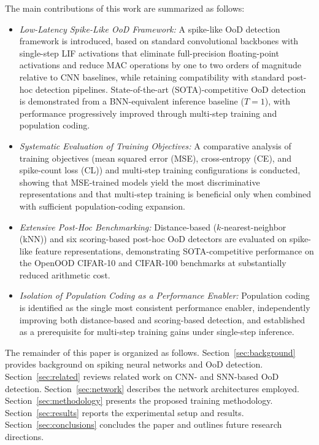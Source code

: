 \documentclass{ieeeaccess}
\begin{document}
The main contributions of this work are summarized as follows:
\begin{itemize}
  \item \textit{Low-Latency Spike-Like OoD Framework:} A spike-like OoD detection framework is introduced, based on standard convolutional backbones with single-step LIF activations that eliminate full-precision floating-point activations and reduce MAC operations by one to two orders of magnitude relative to CNN baselines, while retaining compatibility with standard post-hoc detection pipelines. State-of-the-art (SOTA)-competitive OoD detection is demonstrated from a BNN-equivalent inference baseline ($T=1$), with performance progressively improved through multi-step training and population coding.
  \item \textit{Systematic Evaluation of Training Objectives:} A comparative analysis of training objectives (mean squared error (MSE), cross-entropy (CE), and spike-count loss (CL)) and multi-step training configurations is conducted, showing that MSE-trained models yield the most discriminative representations and that multi-step training is beneficial only when combined with sufficient population-coding expansion.
  \item \textit{Extensive Post-Hoc Benchmarking:} Distance-based ($k$-nearest-neighbor (kNN)) and six scoring-based post-hoc OoD detectors are evaluated on spike-like feature representations, demonstrating SOTA-competitive performance on the OpenOOD CIFAR-10 and CIFAR-100 benchmarks at substantially reduced arithmetic cost.
  \item \textit{Isolation of Population Coding as a Performance Enabler:} Population coding is identified as the single most consistent performance enabler, independently improving both distance-based and scoring-based detection, and established as a prerequisite for multi-step training gains under single-step inference.
\end{itemize}

The remainder of this paper is organized as follows. Section~\ref{sec:background} provides background on spiking neural networks and OoD detection. Section~\ref{sec:related} reviews related work on CNN- and SNN-based OoD detection. Section~\ref{sec:network} describes the network architectures employed. Section~\ref{sec:methodology} presents the proposed training methodology. Section~\ref{sec:results} reports the experimental setup and results. Section~\ref{sec:conclusions} concludes the paper and outlines future research directions.
\end{document}
